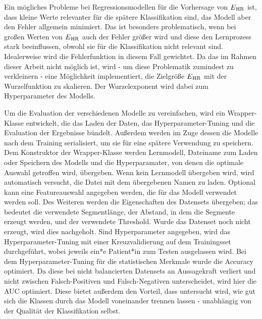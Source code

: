 Ein mögliches Probleme bei Regressionsmodellen für die Vorhersage von $E\textsubscript{HR}$ ist, dass kleine Werte relevanter für die spätere Klassifikation sind, das Modell aber den Fehler allgemein minimiert. Das ist besonders problematisch, wenn bei großen Werten von $E\textsubscript{HR}$ auch der Fehler größer wird und diese den Lernprozess stark beeinflussen, obwohl sie für die Klassifikation nicht relevant sind. Idealerweise wird die Fehlerfunktion in diesem Fall gewichtet. Da das im Rahmen dieser Arbeit nicht möglich ist, wird - um diese Problematik zumindest zu verkleinern - eine Möglichkeit implementiert, die Zielgröße $E\textsubscript{HR}$ mit der Wurzelfunktion zu skalieren. Der Wurzelexponent wird dabei zum Hyperparameter des Modells.


Um die Evaluation der verschiedenen Modelle zu vereinfachen, wird ein Wrapper-Klasse entwickelt, die das Laden der Daten, das Hyperparameter-Tuning und die Evaluation der Ergebnisse bündelt. Außerdem werden im Zuge dessen die Modelle nach dem Training serialisiert, um sie für eine spätere Verwendung zu speichern. Dem Konstruktor der Wrapper-Klasse werden Lernmodell, Dateiname zum Laden oder Speichern des Modells und die Hyperparamater, von denen die optimale Auswahl getroffen wird, übergeben. Wenn kein Lernmodell übergeben wird, wird automatisch versucht, die Datei mit dem übergebenen Namen zu laden. Optional kann eine Featureauswahl angegeben werden, die für das Modell verwendet werden soll. Des Weiteren werden die Eigenschaften des Datensets übergeben; das bedeutet die verwendete Segmentlänge, der Abstand, in dem die Segmente erzeugt werden, und der verwendete Threshold. Wurde das Datenset noch nicht erzeugt, wird dies nachgeholt. Sind Hyperparameter angegeben, wird das Hyperparameter-Tuning mit einer Kreuzvalidierung auf dem Trainingsset durchgeführt, wobei jeweils ein*e Patient*in zum Testen ausgelassen wird. Bei dem Hyperparameter-Tuning für die statistischen Merkmale wurde die Accuracy optimiert. Da diese bei nicht balancierten Datensets an Aussagekraft verliert und nicht zwischen Falsch-Positiven und Falsch-Negativen unterscheidet, wird hier die \ac{AUC} optimiert. Diese bietet außerdem den Vorteil, dass untersucht wird, wie gut sich die Klassen durch das Modell voneinander trennen lassen - unabhängig von der Qualität der Klassifikation selbst.



